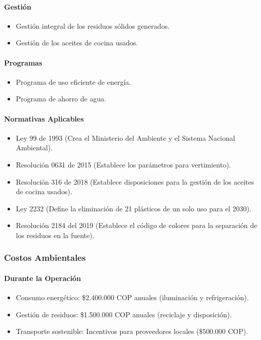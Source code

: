 \documentclass[letterpaper, 11pt]{report}
\begin{document}
\paragraph{Gestión}
\begin{itemize}
      \item Gestión integral de los residuos sólidos generados.
      \item Gestión de los aceites de cocina usados.
\end{itemize}

\paragraph{Programas}
\begin{itemize}
      \item Programa de uso eficiente de energía.
      \item Programa de ahorro de agua.
\end{itemize}

\paragraph{Normativas Aplicables}
\begin{itemize}
      \item Ley 99 de 1993 (Crea el Ministerio del Ambiente y el Sistema Nacional Ambiental).
      \item Resolución 0631 de 2015 (Establece los parámetros para vertimiento).
      \item Resolución 316 de 2018 (Establece disposiciones para la gestión de los aceites de cocina usados).
      \item Ley 2232 (Define la eliminación de 21 plásticos de un solo uso para el 2030).
      \item Resolución 2184 del 2019 (Establece el código de colores para la separación de los residuos en la fuente).
\end{itemize}

\subsubsection{Costos Ambientales}

\paragraph{Durante la Operación}
\begin{itemize}
      \item Consumo energético: \$2.400.000 COP anuales (iluminación y refrigeración).
      \item Gestión de residuos: \$1.500.000 COP anuales (reciclaje y disposición).
      \item Transporte sostenible: Incentivos para proveedores locales (\$500.000 COP).
\end{itemize}
\end{document}
